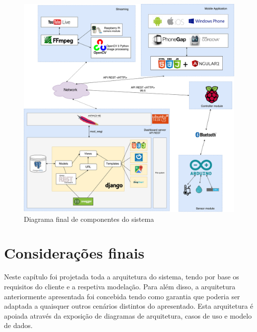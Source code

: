 \begin{figure}[!htb]
	\centering
	\includegraphics[width=\linewidth]{esquemas/arquitetura-final.pdf}
	\caption{Diagrama final de componentes do sistema}
	\label{componentesall}
\end{figure}

\section{Considerações finais}


Neste capítulo foi projetada toda a arquitetura do sistema, tendo por base os requisitos do cliente e a respetiva modelação. Para além disso, a arquitetura anteriormente apresentada foi concebida tendo como garantia que poderia ser adaptada a quaisquer outros cenários distintos do apresentado. Esta arquitetura é apoiada através da exposição de diagramas de arquitetura, casos de uso e modelo de dados. 

